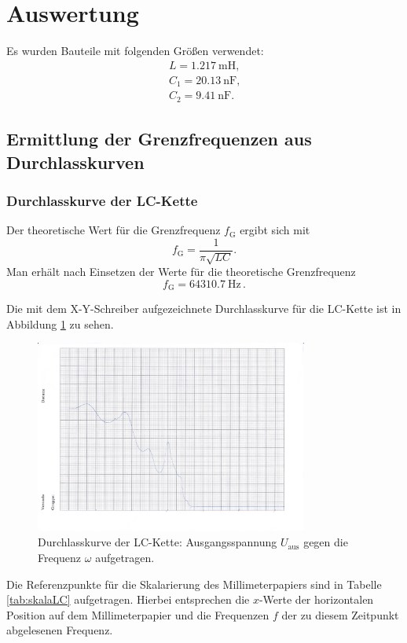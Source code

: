 \section{Auswertung}
\label{sec:Auswertung}

Es wurden Bauteile mit folgenden Größen verwendet:
\begin{gather*}
	L = \SI{1.217}{\milli\henry} \text{,} \\
	C_1 = \SI{20.13}{\nano\farad} \text{,} \\
	C_2 = \SI{9.41}{\nano\farad} \text{.}
\end{gather*}


\subsection{Ermittlung der Grenzfrequenzen aus Durchlasskurven}

\subsubsection{Durchlasskurve der LC-Kette}
\label{sec:durchLC}
Der theoretische Wert für die Grenzfrequenz $f_{\text{G}}$ ergibt sich mit 
\begin{equation}
	f_{\text{G}} = \frac{1}{\pi \sqrt{LC}} \text{.}
\end{equation}
Man erhält nach Einsetzen der Werte für die theoretische Grenzfrequenz
\begin{equation*}
	f_{\text{G}} = \SI{64310.7}{\hertz} \, \text{.}
\end{equation*}

Die mit dem X-Y-Schreiber aufgezeichnete Durchlasskurve für die LC-Kette ist in Abbildung
\ref{fig:durchiLC} zu sehen.
\begin{figure}
	\centering
	\includegraphics[width=0.8\textwidth]{Bilder/durchlasskurve_lc_kette.jpg}
	\caption{Durchlasskurve der LC-Kette: Ausgangsspannung $U_{\text{aus}}$ gegen die
		Frequenz $\omega$ aufgetragen.}
	\label{fig:durchiLC}
\end{figure}
Die Referenzpunkte für die Skalarierung des Millimeterpapiers sind in Tabelle
\ref{tab:skalaLC} aufgetragen. Hierbei entsprechen die $x$-Werte der horizontalen Position
auf dem Millimeterpapier und die Frequenzen $f$ der zu diesem Zeitpunkt abgelesenen Frequenz.

